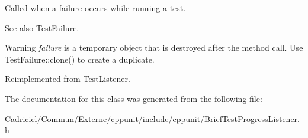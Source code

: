 Called when a failure occurs while running a test. 

\begin{DoxySeeAlso}{See also}
\hyperlink{class_test_failure}{Test\+Failure}. 
\end{DoxySeeAlso}
\begin{DoxyWarning}{Warning}
{\itshape failure} is a temporary object that is destroyed after the method call. Use Test\+Failure\+::clone() to create a duplicate. 
\end{DoxyWarning}


Reimplemented from \hyperlink{class_test_listener_a103216a5814c907f7b752b969477e765}{Test\+Listener}.



The documentation for this class was generated from the following file\+:\begin{DoxyCompactItemize}
\item 
Cadriciel/\+Commun/\+Externe/cppunit/include/cppunit/Brief\+Test\+Progress\+Listener.\+h\end{DoxyCompactItemize}
